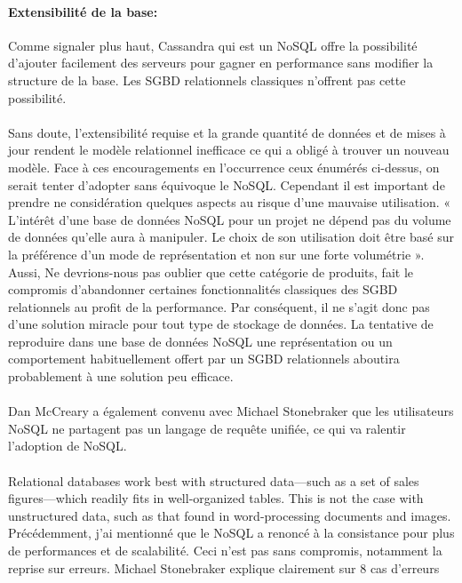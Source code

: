 \paragraph{Extensibilité de la base:} Comme signaler plus haut, 
\textsf{Cassandra} qui est un \textsf{NoSQL} offre la possibilité 
d'ajouter facilement des serveurs pour gagner en performance sans modifier 
la structure de la base. Les \textsf{SGBD} relationnels classiques 
n'offrent pas cette possibilité.
\\ 
\\ 
Sans doute, l'extensibilité requise et la grande quantité de données
et de mises à jour rendent le modèle relationnel inefficace ce qui a
obligé à trouver un nouveau modèle.  Face à ces encouragements en
l'occurrence ceux énumérés ci-dessus, on serait tenter d'adopter sans
équivoque le \textsf{NoSQL}. Cependant il est important de prendre ne
considération quelques aspects au risque d'une mauvaise utilisation. «
L’intérêt d’une base de données \textsf{NoSQL} pour un projet ne
dépend pas du volume de données qu’elle aura à manipuler. Le choix de
son utilisation doit être basé sur la préférence d’un mode de
représentation et non sur une forte volumétrie
»\cite{NoSQLeurope}. Aussi, Ne devrions-nous pas oublier que cette
catégorie de produits, fait le compromis d'abandonner certaines
fonctionnalités classiques des \textsf{SGBD} relationnels au profit de
la performance. Par conséquent, il ne s’agit donc pas d’une solution
miracle pour tout type de stockage de données.  La tentative de
reproduire dans une base de données \textsf{NoSQL} une représentation
ou un comportement habituellement offert par un \textsf{SGBD}
relationnels aboutira probablement à une solution peu efficace.
\\
\\
Dan McCreary a également convenu avec Michael Stonebraker que les
utilisateurs NoSQL ne partagent pas un langage de requête unifiée, ce
qui va ralentir l'adoption de NoSQL\cite{SergeLeblal}.
\\
\\
Relational databases work best with structured data—such as a set of
sales figures—which readily fits in well-organized tables. This is not
the case with unstructured data, such as that found in word-processing
documents and images\cite{NealLeavitt}.
\newpage
\noindent Précédemment, j'ai mentionné que le \textsf{NoSQL} a renoncé à la consistance
pour plus de performances et de scalabilité. Ceci n'est pas sans compromis, notamment 
la reprise sur erreurs. \textsf{Michael Stonebraker} explique clairement sur 8 cas d'erreurs 
